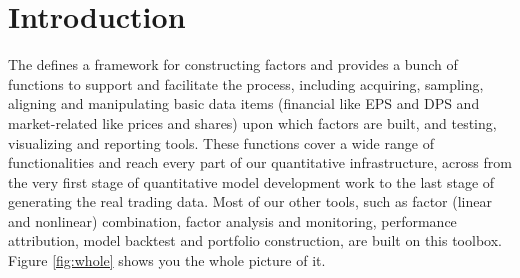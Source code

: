 \section{Introduction\label{sec:intro}}
\setcounter{page}{1}

The \toolboxname{} defines a framework for constructing factors 
and provides a bunch of functions to support and facilitate the process,
including acquiring, sampling, aligning and manipulating basic data items
(financial like EPS and DPS and market-related like prices and shares)
upon which factors are built, 
and testing, visualizing and reporting tools.
These functions cover a wide range of functionalities and reach
every part of our quantitative infrastructure,
across from the very first stage of quantitative model development work 
to the last stage of generating the real trading data.
Most of our other tools, such as factor (linear and nonlinear) combination,
factor analysis and monitoring, performance attribution, 
model backtest and portfolio construction, are built on this toolbox.
Figure \ref{fig:whole} shows you the whole picture of it.

